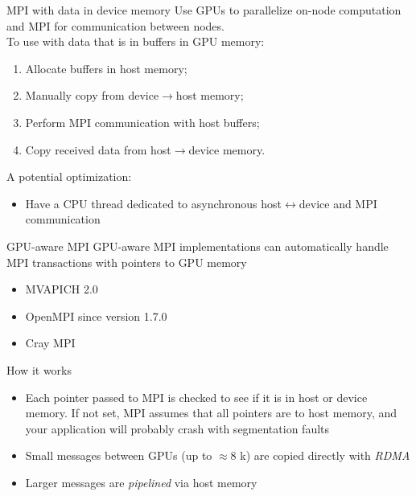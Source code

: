 \documentclass[aspectratio=43]{beamer}
\begin{document}
\begin{frame}[fragile]{MPI with data in device memory}
    Use GPUs to parallelize on-node computation and MPI for communication between nodes.\\
    \medskip
    To use with data that is in buffers in GPU memory:
    \begin{enumerate}
        \item Allocate buffers in host memory;
        \item Manually copy from device$\rightarrow$host memory;
        \item Perform MPI communication with host buffers;
        \item Copy received data from host$\rightarrow$device memory.
    \end{enumerate}
    \medskip
    A potential optimization:
    \begin{itemize}
        \item Have a CPU thread dedicated to asynchronous host$\leftrightarrow$device and MPI communication
    \end{itemize}
\end{frame}

\begin{frame}[fragile]{GPU-aware MPI}
        GPU-aware MPI implementations can automatically handle MPI transactions with pointers to GPU memory
        \begin{itemize}
            \item MVAPICH 2.0
            \item OpenMPI since version 1.7.0
            \item Cray MPI
        \end{itemize}

    \begin{info}{How it works}
        \begin{itemize}
            \item Each pointer passed to MPI is checked to see if it is in host or device memory.
            If not set, MPI assumes that all pointers are to host memory, and your application will probably crash with segmentation faults
            \item Small messages between GPUs (up to $\approx$8 k) are copied directly with \emph{RDMA}
            \item Larger messages are \emph{pipelined} via host memory
        \end{itemize}
    \end{info}

\end{frame}
\end{document}
